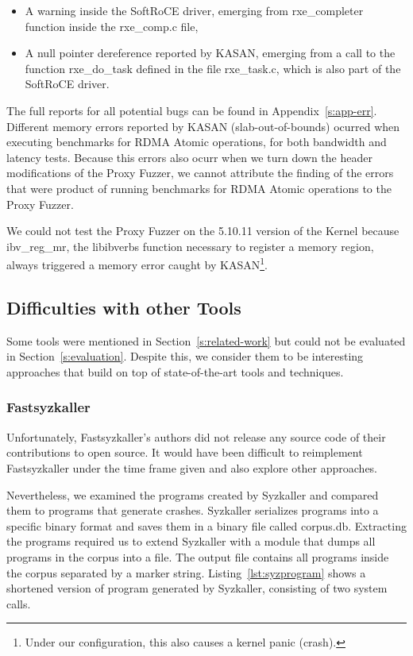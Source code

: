 \begin{itemize}
  \item A warning inside the SoftRoCE driver, emerging from rxe\_completer function inside the rxe\_comp.c file,
  \item A null pointer dereference reported by KASAN, emerging from a call to the function rxe\_do\_task defined in the file rxe\_task.c, which is also part of the SoftRoCE driver.
\end{itemize}

The full reports for all potential bugs can be found in Appendix~\ref{s:app-err}.\\

Different memory errors reported by KASAN (slab-out-of-bounds) ocurred when executing benchmarks
for RDMA Atomic operations, for both bandwidth and latency tests.
Because this errors also ocurr when we turn down the header modifications
of the Proxy Fuzzer, we cannot attribute the finding of the errors that
were product of running benchmarks for RDMA Atomic operations to the Proxy Fuzzer.

We could not test the Proxy Fuzzer on the 5.10.11 version of the Kernel because ibv\_reg\_mr,
the libibverbs function necessary to register a memory region, always triggered a memory error
caught by KASAN\footnote{Under our configuration, this also causes a kernel panic (crash).}.


\subsection{Difficulties with other Tools}

Some tools were mentioned in Section~\ref{s:related-work} but could not be evaluated in Section~\ref{s:evaluation}.
Despite this, we consider them to be interesting approaches that build on top of state-of-the-art tools and techniques.

\subsubsection{Fastsyzkaller}

Unfortunately, Fastsyzkaller's authors did not release any source code of their contributions to open source.
It would have been difficult to reimplement Fastsyzkaller under the time frame given and also explore
other approaches.

Nevertheless, we examined the programs created by Syzkaller and compared them to programs that generate crashes.
Syzkaller serializes programs into a specific binary format and saves them in a binary file called corpus.db.
Extracting the programs required us to extend Syzkaller with a module that dumps all programs in the corpus into a file.
The output file contains all programs inside the corpus separated by a marker string. Listing~\ref{lst:syzprogram} shows
a shortened version of program generated by Syzkaller, consisting of two system calls.

